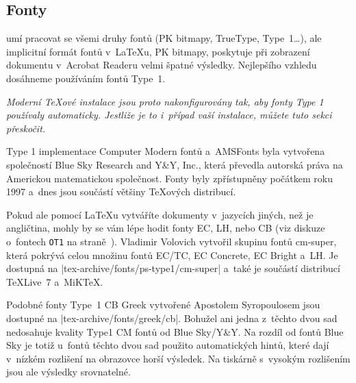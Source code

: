 \subsection{Fonty}
\def\pdfLaTeX{pdf\LaTeX}

\wi{\pdfLaTeX} umí pracovat se všemi druhy fontů (PK bitmapy, TrueType,
\PSi{} Type~1\dots), ale implicitní formát fontů v~\LaTeX u, PK bitmapy,
poskytuje při zobrazení dokumentu v~Acrobat Readeru velmi špatné výsledky.
Nejlepšího vzhledu dosáhneme používáním fontů \PSi{} Type~1.

\emph{Moderní \TeX ové instalace jsou proto nakonfigurovány tak,
aby fonty Type 1 používaly automaticky. Jestliže je to i~případ vaší
instalace, můžete tuto sekci přeskočit.}

\PSi{} Type 1 implementace Computer Modern fontů a~AMSFonts
byla vytvořena společností Blue Sky Research and Y\&Y, Inc.,
která převedla autorská práva na Americkou matematickou společnost.
Fonty byly zpřístupněny počátkem roku 1997 a~dnes jsou součástí
většiny \TeX ových distribucí.

Pokud ale pomocí \LaTeX u vytváříte dokumenty v~jazycích jiných,
než je angličtina, mohly by se vám lépe hodit fonty EC, LH, nebo
CB (viz diskuze o~fontech \texttt{OT1} na straně~\pageref{OT1}).
Vladimir Volovich vytvořil skupinu fontů cm-super, která pokrývá
celou množinu fontů EC/TC, EC Concrete, EC Bright a~LH. Je dostupná
na \CTANalt|tex-archive/fonts/ps-type1/cm-super| a~také je součástí
distribucí \TeX{}Live~7 a~MiK\TeX. 

Podobné fonty Type~1 CB Greek
vytvořené Apostolem Syropoulosem jsou dostupné na 
\CTANalt|tex-archive/fonts/greek/cb|.
Bohužel %
ani jedna z~těchto dvou sad nedosahuje kvality Type1 CM fontů od
Blue Sky/Y\&Y. Na rozdíl od fontů Blue Sky je totiž u~fontů těchto dvou sad
použito automatických hintů, které dají v~nízkém rozlišení na obrazovce horší výsledek.
Na tiskárně s~vysokým rozlišením jsou ale výsledky srovnatelné.


